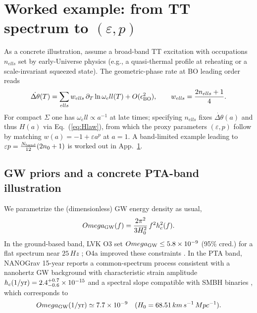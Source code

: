 \documentclass[aps,prd,twocolumn,amsmath,amssymb,nofootinbib,superscriptaddress]{revtex4-2}
\def\mathcal#1{#1}%
\def\mathrm#1{#1}%
\def\Omega{Omega}\def\sigma{sigma}\def\chi{chi}\def\ell{ell}%
\begin{document}
\section{Worked example: from TT spectrum to $(\varepsilon,p)$}
\label{sec:worked_example_micro}
As a concrete illustration, assume a broad-band TT excitation with occupations $n_{\ell s}$ set by early-Universe physics (e.g., a quasi-thermal profile at reheating or a scale-invariant squeezed state). The geometric-phase rate at BO leading order reads
\begin{equation}
\dot{\Delta\theta}(T)=\sum_{\ell s} w_{\ell s}\,\partial_T\ln\omega_\ell(T)
+\mathcal{O}(\epsilon_{\rm BO}^2),\qquad
w_{\ell s}=\frac{2n_{\ell s}+1}{4}.
\end{equation}
For compact $\Sigma$ one has $\omega_\ell\propto a^{-1}$ at late times; specifying $n_{\ell s}$ fixes $\dot{\Delta\theta}(a)$ and thus $H(a)$ via Eq.~(\ref{eq:Hlaw}), from which the proxy parameters $(\varepsilon,p)$ follow by matching $w(a)=-1+\varepsilon a^p$ at $a=1$. A band-limited example leading to $\varepsilon p=\frac{N_{\rm band}}{12}(2n_0+1)$ is worked out in App.~\ref{sec:worked_example_micro}.

\subsection*{GW priors and a concrete PTA-band illustration}
\label{subsec:gw_priors_example}
We parametrize the (dimensionless) GW energy density as usual,
\begin{equation}
  \Omega_{\rm GW}(f)=\frac{2\pi^2}{3H_0^2}\,f^2 h_c^2(f).
\end{equation}
In the ground-based band, LVK O3 set $\Omega_{\rm GW}\le 5.8\times10^{-9}$ (95\% cred.) for a flat spectrum near $25\,\mathrm{Hz}$ \cite{LVK_O3_SGWB}; O4a improved these constraints \cite{LVK_O4a_SGWB}. In the PTA band, NANOGrav 15-year reports a common-spectrum process consistent with a nanohertz GW background with characteristic strain amplitude $h_c(1/{\rm yr})=2.4^{+0.7}_{-0.6}\times10^{-15}$ and a spectral slope compatible with SMBH binaries \cite{NANOGrav15yr_Evidence,NANOGrav15yr_Methods}, which corresponds to
\begin{equation}
  \Omega_{\rm GW}(1/{\rm yr})\simeq 7.7\times 10^{-9}\quad(H_0=68.51\,\mathrm{km\,s^{-1}\,Mpc^{-1}}).
\end{equation}
\end{document}
